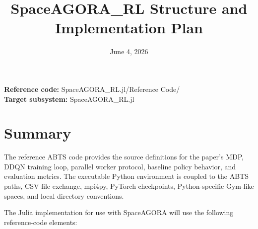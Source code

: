 \documentclass[11pt]{article}
\title{SpaceAGORA\_RL Structure and Implementation Plan}
\date{June 4, 2026}
\begin{document}
\maketitle


\textbf{Reference code:} SpaceAGORA\_RL.jl/Reference Code/\\
\textbf{Target subsystem:} SpaceAGORA\_RL.jl\\


\section{Summary}

The reference ABTS code provides the source definitions for the paper's MDP, DDQN training loop, parallel worker protocol, baseline policy behavior, and evaluation metrics. The executable Python environment is coupled to the ABTS paths, CSV file exchange, mpi4py, PyTorch checkpoints, Python-specific Gym-like spaces, and local directory conventions.

The Julia implementation for use with SpaceAGORA will use the following reference-code elements:
\end{document}
